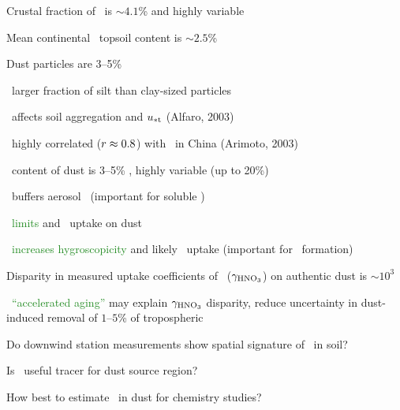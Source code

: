 \documentclass[final,dvips]{foils}
\begin{document}
\rotatefoilhead{\bgl
\Large\textcolor{blue}{\hfill Silly \Ca\ Factoids \hfill}}\vspace{-0.75in}\large
\vspace{-0.5in}
\begin{enumerate*}
\item Crustal fraction of \Ca\ is $\sim 4.1$\% and highly variable %
\item Mean continental \CaCOt\ topsoil content is $\sim 2.5$\% \cite[]{Sch99}
\item Dust particles are 3--5\% \CaCOt\ \cite[]{Pye87}
\item \CaCOt\ larger fraction of silt than clay-sized particles \cite[]{CSB99}
\item \CaCOt\ affects soil aggregation and $u_{* \mathrm{t}}$ (Alfaro, 2003)
\item \CaCOt\ highly correlated ($r \approx 0.8$) with \Al\ in
  China (Arimoto, 2003)
\end{enumerate*}

\rotatefoilhead{\bgl
\Large\textcolor{blue}{\hfill Why study \Ca\ in dust? \hfill}}\vspace{-0.75in}\large
\begin{enumerate*}
\item \CaCOt\ content of dust is 3--5\% \cite[]{Pye87}, highly variable (up to 20\%)
\item \CaCOt\ buffers aerosol \pH\ (important for soluble \Fe)
\item \CaCOt\ \textcolor{ForestGreen}{limits \HNOt} and \SOd\ uptake on dust \cite[]{DCZ96}
\item \CaCOt\ \textcolor{ForestGreen}{increases hygroscopicity}
\cite[]{KGL03} and likely \HNOt\ uptake (important for \Ot\ formation)
\item Disparity in measured uptake coefficients of \HNOt\
  ($\mssuptcffHNOt$) on authentic dust is $\sim 10^{3}$
  \cite[e.g.,][]{HaC01a,Gra02}
\item \Ca\ \textcolor{ForestGreen}{``accelerated aging''} may explain
  $\mssuptcffHNOt$ disparity, reduce uncertainty in dust-induced
  removal of $1$--$5$\% of tropospheric \Ot\ \cite[]{BiZ04}  
\end{enumerate*}

\rotatefoilhead{\bgl
\Large\textcolor{blue}{\hfill Objectives \hfill}}\vspace{-0.75in}\large
\begin{enumerate*}
\item Do downwind station measurements show spatial signature of \Ca\  
  in soil? 
\item Is \Ca\ useful tracer for dust source region?
\item How best to estimate \Ca\ in dust for chemistry studies?
\end{enumerate*}
\end{document}
